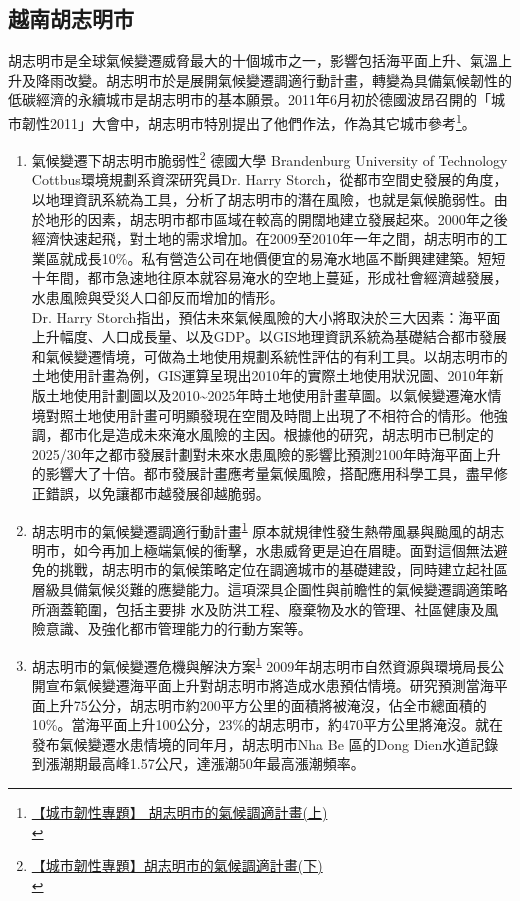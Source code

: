 \documentclass[a4paper,12pt]{article}
\begin{document}
\subsection{越南胡志明市}
\label{sec:orga3cb05b}
胡志明市是全球氣候變遷威脅最大的十個城市之一，影響包括海平面上升、氣溫上升及降雨改變。胡志明市於是展開氣候變遷調適行動計畫，轉變為具備氣候韌性的低碳經濟的永續城市是胡志明市的基本願景。2011年6月初於德國波昂召開的「城市韌性2011」大會中，胡志明市特別提出了他們作法，作為其它城市參考\footnote{\href{https://e-info.org.tw/node/68861}{【城市韌性專題】 胡志明市的氣候調適計畫(上)}\\\label{org1ee9921}}。\\
\begin{enumerate}
\item 氣候變遷下胡志明市脆弱性\footnote{\href{https://e-info.org.tw/node/68862}{【城市韌性專題】胡志明市的氣候調適計畫(下)}\\\label{orgccbe762}}
\label{sec:org61b4f87}
德國大學 Brandenburg University of Technology Cottbus環境規劃系資深研究員Dr. Harry Storch，從都市空間史發展的角度，以地理資訊系統為工具，分析了胡志明市的潛在風險，也就是氣候脆弱性。由於地形的因素，胡志明市都市區域在較高的開闊地建立發展起來。2000年之後經濟快速起飛，對土地的需求增加。在2009至2010年一年之間，胡志明市的工業區就成長10\%。私有營造公司在地價便宜的易淹水地區不斷興建建築。短短十年間，都市急速地往原本就容易淹水的空地上蔓延，形成社會經濟越發展，水患風險與受災人口卻反而增加的情形。\\

Dr. Harry Storch指出，預估未來氣候風險的大小將取決於三大因素：海平面上升幅度、人口成長量、以及GDP。以GIS地理資訊系統為基礎結合都市發展和氣候變遷情境，可做為土地使用規劃系統性評估的有利工具。以胡志明市的土地使用計畫為例，GIS運算呈現出2010年的實際土地使用狀況圖、2010年新版土地使用計劃圖以及2010\textasciitilde{}2025年時土地使用計畫草圖。以氣候變遷淹水情境對照土地使用計畫可明顯發現在空間及時間上出現了不相符合的情形。他強調，都市化是造成未來淹水風險的主因。根據他的研究，胡志明市已制定的2025/30年之都市發展計劃對未來水患風險的影響比預測2100年時海平面上升的影響大了十倍。都市發展計畫應考量氣候風險，搭配應用科學工具，盡早修正錯誤，以免讓都市越發展卻越脆弱。\\
\item 胡志明市的氣候變遷調適行動計畫\textsuperscript{\ref{org1ee9921}}
\label{sec:orge382dac}
原本就規律性發生熱帶風暴與颱風的胡志明市，如今再加上極端氣候的衝擊，水患威脅更是迫在眉睫。面對這個無法避免的挑戰，胡志明市的氣候策略定位在調適城市的基礎建設，同時建立起社區層級具備氣候災難的應變能力。這項深具企圖性與前瞻性的氣候變遷調適策略所涵蓋範圍，包括主要排 水及防洪工程、廢棄物及水的管理、社區健康及風險意識、及強化都市管理能力的行動方案等。\\
\item 胡志明市的氣候變遷危機與解決方案\textsuperscript{\ref{org1ee9921}}
\label{sec:org9bee6d6}
2009年胡志明市自然資源與環境局長公開宣布氣候變遷海平面上升對胡志明市將造成水患預估情境。研究預測當海平面上升75公分，胡志明市約200平方公里的面積將被淹沒，佔全市總面積的10\%。當海平面上升100公分，23\%的胡志明市，約470平方公里將淹沒。就在發布氣候變遷水患情境的同年月，胡志明市Nha Be 區的Dong Dien水道記錄到漲潮期最高峰1.57公尺，達漲潮50年最高漲潮頻率。\\


\end{enumerate}
\end{document}
